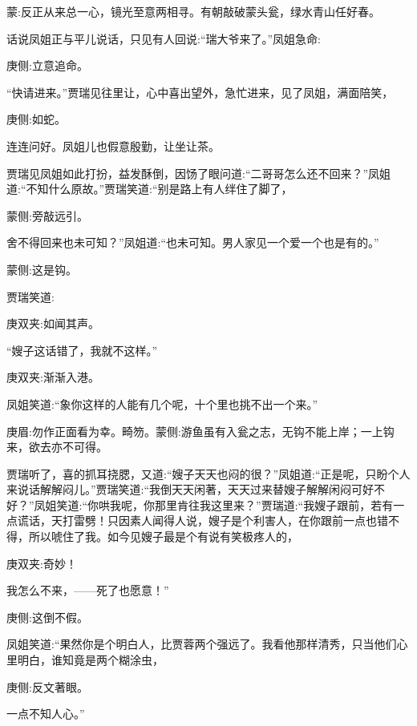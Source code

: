 
\begin{parag}
    \begin{note}蒙:反正从来总一心，镜光至意两相寻。有朝敲破蒙头瓮，绿水青山任好春。\end{note}
\end{parag}


\begin{parag}
    话说凤姐正与平儿说话，只见有人回说:“瑞大爷来了。”凤姐急命:\begin{note}庚侧:立意追命。\end{note}“快请进来。”贾瑞见往里让，心中喜出望外，急忙进来，见了凤姐，满面陪笑，\begin{note}庚侧:如蛇。\end{note}连连问好。凤姐儿也假意殷勤，让坐让茶。
\end{parag}


\begin{parag}
    贾瑞见凤姐如此打扮，益发酥倒，因饧了眼问道:“二哥哥怎么还不回来？”凤姐道:“不知什么原故。”贾瑞笑道:“别是路上有人绊住了脚了，\begin{note}蒙侧:旁敲远引。\end{note}舍不得回来也未可知？”凤姐道:“也未可知。男人家见一个爱一个也是有的。”\begin{note}蒙侧:这是钩。\end{note}贾瑞笑道:\begin{note}庚双夹:如闻其声。\end{note}“嫂子这话错了，我就不这样。”\begin{note}庚双夹:渐渐入港。\end{note}凤姐笑道:“象你这样的人能有几个呢，十个里也挑不出一个来。”\begin{note}庚眉:勿作正面看为幸。畸笏。蒙侧:游鱼虽有入瓮之志，无钩不能上岸；一上钩来，欲去亦不可得。\end{note}贾瑞听了，喜的抓耳挠腮，又道:“嫂子天天也闷的很？”凤姐道:“正是呢，只盼个人来说话解解闷儿。”贾瑞笑道:“我倒天天闲著，天天过来替嫂子解解闲闷可好不好？”凤姐笑道:“你哄我呢，你那里肯往我这里来？”贾瑞道:“我嫂子跟前，若有一点谎话，天打雷劈！只因素人闻得人说，嫂子是个利害人，在你跟前一点也错不得，所以唬住了我。如今见嫂子最是个有说有笑极疼人的，\begin{note}庚双夹:奇妙！\end{note}我怎么不来，——死了也愿意！”\begin{note}庚侧:这倒不假。\end{note}凤姐笑道:“果然你是个明白人，比贾蓉两个强远了。我看他那样清秀，只当他们心里明白，谁知竟是两个糊涂虫，\begin{note}庚侧:反文著眼。\end{note}一点不知人心。”
\end{parag}


